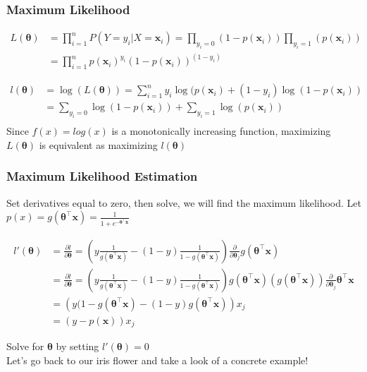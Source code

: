 \documentclass{beamer}
\begin{document}
\begin{frame}
\frametitle{Maximum Likelihood}

\begin{equation}
\begin{aligned}
L(\bm{\theta}) &= \prod_{i=1}^n P(Y = y_{i}  | X = \mathbf{x}_{i}) = \prod_{y_{i} = 0 } (1-p(\mathbf{x}_{i})) \prod_{y_{i} = 1 } (p(\mathbf{x}_{i})) \\
&= \prod_{i=1}^{n} p(\mathbf{x}_{i})^{y_{i} }(1-p(\mathbf{x}_{i}))^{(1-{y_{i}})}
\end{aligned}
\end{equation}

\begin{equation}
\begin{aligned}
l (\bm{\theta}) &=  \log (L(\bm{\theta}) ) = \sum_{i=1}^{n} y_{i} \log(p(\mathbf{x}_{i}) + (1-y_{i}) \log(1-p(\mathbf{x}_{i})) \\
&= \sum_{y_{i} = 0 } \log (1-p(\mathbf{x}_{i})) + \sum_{y_{i} = 1} \log (p(\mathbf{x}_{i})) \\
\end{aligned}
\end{equation}
Since $f(x) = log(x)$ is a monotonically increasing function, maximizing $L(\bm{\theta})$ is equivalent as maximizing $l(\bm{\theta})$
\end{frame}
\begin{frame}
\frametitle{Maximum Likelihood Estimation}
Set derivatives equal to zero, then solve, we will find the maximum likelihood.
Let $p(x) = g(\bm{\theta}^{\intercal} \mathbf{x}) = \frac{1}{1+ e^{-\bm{\theta}^{\intercal} \mathbf{x}}}$

\begin{equation}
\begin{aligned}
l'(\bm{\theta}) &= \frac{\partial l}{\partial \bm{\theta}} =\left(y \frac{1}{g(\bm{\theta}^{\intercal} \mathbf{x})} - (1-y) \frac{1}{1-g(\bm{\theta}^{\intercal} \mathbf{x})}\right) 
\frac{\partial }{\partial \bm{\theta}_{j}} g(\bm{\theta}^{\intercal} \mathbf{x}) \\
&= \frac{\partial l}{\partial \bm{\theta}} =\left(y \frac{1}{g(\bm{\theta}^{\intercal} \mathbf{x})} - (1-y) \frac{1}{1-g(\bm{\theta}^{\intercal} \mathbf{x})}\right) 
g(\bm{\theta}^{\intercal} \mathbf{x})(g(\bm{\theta}^{\intercal} \mathbf{x})) 
\frac{\partial }{\partial \bm{\theta}_{j}} \bm{\theta}^{\intercal} \mathbf{x} \\
&= \left(y(1-g(\bm{\theta}^{\intercal} \mathbf{x}) - (1-y) g(\bm{\theta}^{\intercal} \mathbf{x}) \right) x_{j} \\
&= (y - p(\mathbf{x}))x_{j}
\end{aligned}
\end{equation}

Solve for $\bm{\theta}$ by setting $l'(\bm{\theta}) =0$ \\
Let's go back to our iris flower and take a look of a concrete example!


\end{frame}
\end{document}

